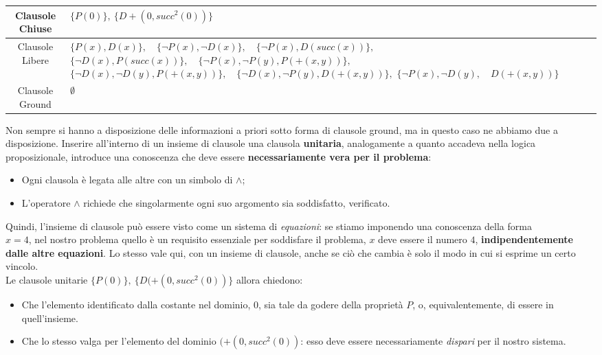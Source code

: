 \documentclass[a4paper,10pt]{article}
\begin{document}
\begin{table}[h]
    \centering
    \small 
    \renewcommand{\arraystretch}{1.5} 
    
    \begin{tabularx}{\textwidth}{|c|>{\centering\arraybackslash}X|}
        \hline
        Clausole Chiuse & $\{P(0)\}, \ \{D+(0,succ^2(0))\}$ \\
        \hline
        Clausole Libere & 
            $\{P(x), D(x)\},\quad \{\lnot P(x), \lnot D(x)\},\quad \{\lnot P(x), D(succ(x))\},$\newline
            $\{\lnot D(x), P(succ(x))\},\quad \{\lnot P(x), \lnot P(y), P(+(x, y))\},$\newline
            $\{\lnot D(x), \lnot D(y), P(+(x, y))\},\quad \{\lnot D(x), \lnot P(y), D(+(x, y))\},$\newline
            $\{\lnot P(x), \lnot D(y),\quad D(+(x, y))\}$ 
            \\
        \hline
        Clausole Ground & $\emptyset$ \\
        \hline
    \end{tabularx}
\end{table}


Non sempre si hanno a disposizione delle informazioni a priori sotto forma di clausole ground, ma in questo caso ne abbiamo due a disposizione. Inserire all'interno di un insieme di clausole una clausola \textbf{unitaria}, analogamente a quanto accadeva nella logica proposizionale, introduce una conoscenza che deve essere \textbf{necessariamente vera per il problema}:
\begin{itemize}
    \item Ogni clausola è legata alle altre con un simbolo di $\land$;
    \item L'operatore $\land$ richiede che singolarmente ogni suo argomento sia soddisfatto, verificato.
\end{itemize}
Quindi, l'insieme di clausole può essere visto come un sistema di \textit{equazioni}: se stiamo imponendo una conoscenza della forma \\$x=4$, nel nostro problema quello è un requisito essenziale per soddisfare il problema, $x$ deve essere il numero $4$, \textbf{indipendentemente dalle altre equazioni}. Lo stesso vale qui, con un insieme di clausole, anche se ciò che cambia è solo il modo in cui si esprime un certo vincolo. \\
Le clausole unitarie $\{P(0)\}, \ \{D(+(0,succ^2(0))\}$ allora chiedono:
\begin{itemize}
    \item Che l'elemento identificato dalla costante nel dominio, $0$, sia tale da godere della proprietà $P$, o, equivalentemente, di essere in quell'insieme.
    \item Che lo stesso valga per l'elemento del dominio $(+(0,succ^2(0))$: esso deve essere necessariamente \textit{dispari} per il nostro sistema.
\end{itemize}
\end{document}
